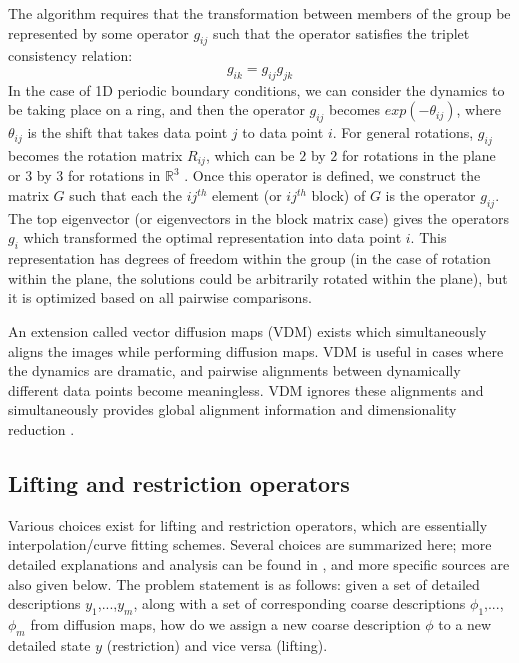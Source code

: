 \documentclass[12pt]{article}
\begin{document}
The algorithm requires that the transformation between members of the group be represented by some operator $g_{ij}$ such that the operator satisfies the triplet consistency relation:
\[
g_{ik} = g_{ij}g_{jk}
\]
In the case of 1D periodic boundary conditions, we can consider the dynamics to be taking place on a ring, and then the operator $g_{ij}$ becomes $exp(-\theta_{ij})$, where $\theta_{ij}$ is the shift that takes data point $j$ to data point $i$. For general rotations, $g_{ij}$ becomes the rotation matrix $R_{ij}$, which can be $2$ by $2$ for rotations in the plane or $3$ by $3$ for rotations in $\mathbb{R}^3$ \cite{Sonday2013}. Once this operator is defined, we construct the matrix $G$ such that each the $ij^{th}$ element (or $ij^{th}$  block) of $G$ is the operator $g_{ij}$. The top eigenvector (or eigenvectors in the block matrix case) gives the operators $g_i$ which transformed the optimal representation into data point $i$. This representation has degrees of freedom within the group (in the case of rotation within the plane, the solutions could be arbitrarily rotated within the plane), but it is optimized based on all pairwise comparisons. \vspace{1mm}

An extension called vector diffusion maps (VDM) exists which simultaneously aligns the images while performing diffusion maps. VDM is useful in cases where the dynamics are dramatic, and pairwise alignments between dynamically different data points become meaningless. VDM ignores these alignments and simultaneously provides global alignment information and dimensionality reduction \cite{Sonday2013, Dsilva}.

\subsection{Lifting and restriction operators} \label{DMLR}

Various choices exist for lifting and restriction operators, which are essentially interpolation/curve fitting schemes. Several choices are summarized here; more detailed explanations and analysis can be found in \cite{Chiavazzo2014}, and more specific sources are also given below. The problem statement is as follows: given a set of detailed descriptions $y_1$,...,$y_\textit{m}$, along with a set of corresponding coarse descriptions $\phi_1$,...,$\phi_\textit{m}$ from diffusion maps, how do we assign a new coarse description $\phi$ to a new detailed state $y$ (restriction) and vice versa (lifting).
\end{document}
